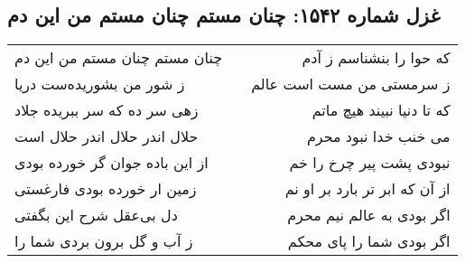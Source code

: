 \begin{center}
\section*{غزل شماره ۱۵۴۲: چنان مستم چنان مستم من این دم}
\label{sec:1542}
\begin{longtable}{l p{0.5cm} r}
چنان مستم چنان مستم من این دم
&&
که حوا را بنشناسم ز آدم
\\
ز شور من بشوریده‌ست دریا
&&
ز سرمستی من مست است عالم
\\
زهی سر ده که سر ببریده جلاد
&&
که تا دنیا نبیند هیچ ماتم
\\
حلال اندر حلال اندر حلال است
&&
می خنب خدا نبود محرم
\\
از این باده جوان گر خورده بودی
&&
نبودی پشت پیر چرخ را خم
\\
زمین ار خورده بودی فارغستی
&&
از آن که ابر تر بارد بر او نم
\\
دل بی‌عقل شرح این بگفتی
&&
اگر بودی به عالم نیم محرم
\\
ز آب و گل برون بردی شما را
&&
اگر بودی شما را پای محکم
\\
\end{longtable}
\end{center}
